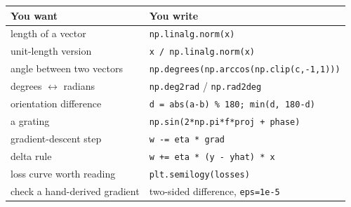 \documentclass[11pt]{article}
\begin{document}
\begin{center}
\begin{tabular}{@{}p{}p{}@{}}
\toprule
\textbf{You want} & \textbf{You write} \\
\midrule
length of a vector                 & \texttt{np.linalg.norm(x)} \\
unit-length version                & \texttt{x / np.linalg.norm(x)} \\
angle between two vectors          & \texttt{np.degrees(np.arccos(np.clip(c,-1,1)))} \\
degrees $\leftrightarrow$ radians  & \texttt{np.deg2rad} / \texttt{np.rad2deg} \\
orientation difference             & \texttt{d = abs(a-b) \% 180; min(d, 180-d)} \\
a grating                          & \texttt{np.sin(2*np.pi*f*proj + phase)} \\
gradient-descent step              & \texttt{w -= eta * grad} \\
delta rule                         & \texttt{w += eta * (y - yhat) * x} \\
loss curve worth reading           & \texttt{plt.semilogy(losses)} \\
check a hand-derived gradient      & two-sided difference, \texttt{eps=1e-5} \\
\bottomrule
\end{tabular}
\end{center}
\end{document}
